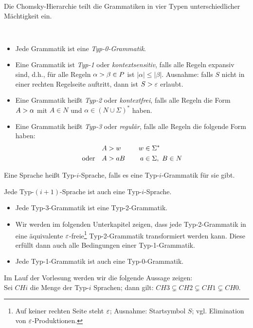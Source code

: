 \bigskip

Die Chomsky-Hierarchie teilt die Grammatiken in vier Typen unterschiedlicher Mächtigkeit ein.
\begin{Def}\
	\begin{itemize}
	\item Jede Grammatik ist eine \emph{Typ-0-Grammatik}.
	\item Eine Grammatik ist \emph{Typ-1} oder
          \emph{kontextsensitiv}, falls alle Regeln expansiv sind,
          d.h., für alle Regeln $\alpha\->\beta\in P$ ist
          $|\alpha|\leq |\beta|$. Ausnahme: falls $S$ nicht in einer
          rechten Regelseite auftritt, dann ist $S\->\varepsilon$ erlaubt. 
	\item Eine Grammatik heißt \emph{Typ-2} oder \emph{kontextfrei}, falls alle Regeln die Form $A\->\alpha$ mit $A\in N$ und $\alpha\in(N\cup\Sigma)^*$ haben.
	\item Eine Grammatik heißt \emph{Typ-3} oder \emph{regulär}, falls alle Regeln die folgende Form haben:
	\begin{alignat*}{2}
		&A\->w &\quad w&\in\Sigma^*\\
		\text{oder}\quad &A\->aB& a&\in\Sigma,\ B\in N
	\end{alignat*}
	\end{itemize}
	Eine Sprache heißt Typ-$i$-Sprache, falls es eine Typ-$i$-Grammatik für sie gibt.
\end{Def}

\begin{Beobachtung}\label{beob:3.ChomskyHierarchie}
	Jede Typ-$(i+1)$-Sprache ist auch eine Typ-$i$-Sprache.
\end{Beobachtung}
\begin{itemize}
 \item Jede Typ-3-Grammatik ist eine Typ-2-Grammatik.
 \item Wir werden im folgenden Unterkapitel zeigen, dass jede Typ-2-Grammatik in eine äquivalente $\varepsilon$-freie\footnote{Auf keiner rechten Seite steht $\varepsilon$; Ausnahme: Startsymbol $S$; vgl. Elimination von $\varepsilon$-Produktionen.} Typ-2-Grammatik transformiert werden kann.
 Diese erfüllt dann auch alle Bedingungen einer Typ-1-Grammatik.
 \item Jede Typ-1-Grammatik ist auch eine Typ-0-Grammatik.
\end{itemize}

Im Lauf der Vorlesung werden wir die folgende Aussage zeigen:\\
Sei $CHi$ die Menge der Typ-$i$ Sprachen; dann gilt: 
$CH3 \subsetneq CH2 \subsetneq CH1 \subsetneq CH0$.




